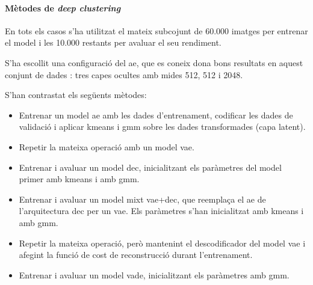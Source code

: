 \documentclass[CAT,BIB]{TFUOC}%
\begin{document}
            \paragraph{Mètodes de \textit{deep clustering}}
                En tots els casos s'ha utilitzat
                el mateix subcojunt de 60.000 imatges per entrenar el model
                i les 10.000 restants per avaluar el seu rendiment.

                S'ha escollit una configuració del \gls{ae},
                que es coneix dona bons resultats en aquest conjunt de dades \citep{Xie2015}:
                tres capes ocultes amb mides 512, 512 i 2048.

                S'han contrastat els següents mètodes:

                \begin{itemize}
                    \item Entrenar un model \gls{ae} amb les dades d'entrenament,
                    codificar les dades de validació
                    i aplicar \gls{kmeans} i \gls{gmm}
                    sobre les dades transformades (capa latent).

                    \item Repetir la mateixa operació amb un model \gls{vae}.

                    \item Entrenar i avaluar un model \gls{dec},
                    inicialitzant els paràmetres del model
                    primer amb \gls{kmeans} i amb \gls{gmm}.

                    \item Entrenar i avaluar un model mixt \gls{vae}+\gls{dec},
                    que reemplaça el \gls{ae} de l'arquitectura \gls{dec}
                    per un \gls{vae}.
                    Els paràmetres s'han inicialitzat amb \gls{kmeans} i amb \gls{gmm}.

                    \item Repetir la mateixa operació,
                    però mantenint el descodificador del model \gls{vae}
                    i afegint la funció de cost de reconstrucció
                    durant l'entrenament.

                    \item Entrenar i avaluar un model \gls{vade},
                    inicialitzant els paràmetres amb \gls{gmm}.
                \end{itemize}
\end{document}
